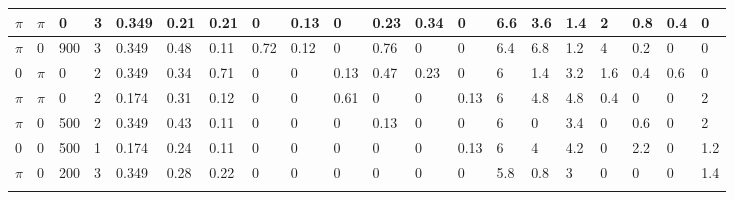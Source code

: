 \begin{table}
{\begin{tabular}{ | l | l | l | l | l | l | l | l | l | l | l | l | l | l | l | l | l | l | l | l |  }
	$\pi$ & $\pi$ & 0 & 3 & 0.349 &   0.21 & 0.21 & 0 & 0.13 & 0 & 0.23 & 0.34 & 0 & 6.6 & 3.6 & 1.4 & 2 & 0.8 & 0.4 & 0 \\ \hline
	$\pi$ & 0 & 900 & 3 & 0.349 &   0.48 & 0.11 & 0.72 & 0.12 & 0 & 0.76 & 0 & 0 & 6.4 & 6.8 & 1.2 & 4 & 0.2 & 0 & 0 \\ \hline
	0 & $\pi$ & 0 & 2 & 0.349 &  0.34 & 0.71 & 0 & 0 & 0.13 & 0.47 & 0.23 & 0 & 6 & 1.4 & 3.2 & 1.6 & 0.4 & 0.6 & 0 \\ \hline
	$\pi$ & $\pi$ & 0 & 2 & 0.174 &   0.31 & 0.12 & 0 & 0 & 0.61 & 0 & 0 & 0.13 & 6 & 4.8 & 4.8 & 0.4 & 0 & 0 & 2 \\ \hline
	$\pi$ & 0 & 500 & 2 & 0.349 &  0.43 & 0.11 & 0 & 0 & 0 & 0.13 & 0 & 0 & 6 & 0 & 3.4 & 0 & 0.6 & 0 & 2 \\ \hline
	0 & 0 & 500 & 1 & 0.174 &  0.24 & 0.11 & 0 & 0 & 0 & 0 & 0 & 0.13 & 6 & 4 & 4.2 & 0 & 2.2 & 0 & 1.2 \\ \hline
	$\pi$ & 0 & 200 & 3 & 0.349 &  0.28 & 0.22 & 0 & 0 & 0 & 0 & 0 & 0 & 5.8 & 0.8 & 3 & 0 & 0 & 0 & 1.4 \\ \hline
\multicolumn{16}{c}{}
\end{tabular}
}
\end{table}

